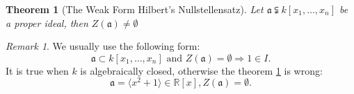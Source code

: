\documentclass{amsart}
\theoremstyle{plain}
\newtheorem{theorem}{Theorem}
\theoremstyle{definition}
\theoremstyle{remark}
\newtheorem*{remark}{Remark}
\numberwithin{equation}{section}
\begin{document}
 \begin{theorem}[The Weak Form Hilbert's Nullstellensatz]\label{2}
 	Let $ \mathfrak{a}\subsetneqq k[x_1,\dots,x_n] $ be a proper ideal, then $ Z(\mathfrak{a})\neq \emptyset $
 \end{theorem}
 \begin{remark}
 	We usually use the following form:
 	$$
 	\mathfrak{a}\subset k[x_1,\dots,x_n] \text{ and } Z(\mathfrak{a})=\emptyset\Rightarrow 1\in I.
 	$$
 	It is true when $ k $ is algebraically closed, otherwise the theorem \ref{2} is wrong:
 	$$
 	\mathfrak{a}=\langle x^2+1\rangle \in \mathbb{R}[x], Z(\mathfrak{a})=\emptyset.
 	$$
 \end{remark}
  
\end{document}
